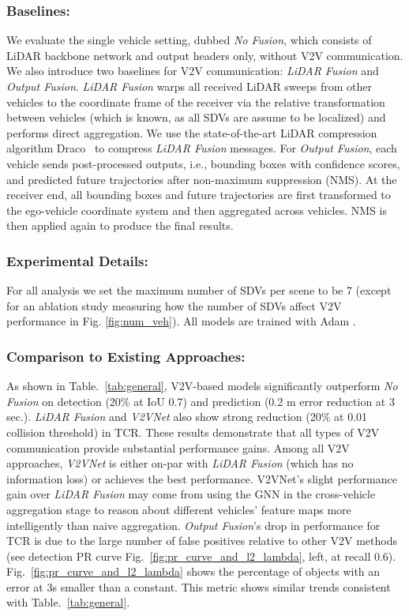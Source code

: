 \documentclass[runningheads]{llncs}
\newcommand{\tabref}{Table.~\ref}
\newcommand{\figref}{Fig.~\ref}
\begin{document}
\subsubsection{Baselines:}
We evaluate the single vehicle setting, dubbed \textit{No Fusion}, which consists of LiDAR backbone network and output headers only, without V2V communication. We also  introduce two baselines for V2V communication: \textit{LiDAR Fusion} and \textit{Output Fusion}.  \textit{LiDAR Fusion} warps all received LiDAR sweeps from other vehicles to the coordinate frame of the receiver
via the relative transformation between vehicles (which is known, as all SDVs are assume to be localized) and performs direct aggregation.
We use the state-of-the-art LiDAR compression algorithm Draco~\cite{draco} to compress \textit{LiDAR Fusion} messages.
For \textit{Output Fusion}, each vehicle sends post-processed outputs, i.e., bounding boxes with confidence scores, and predicted future trajectories after non-maximum suppression (NMS). At the receiver end, all bounding boxes and future trajectories are first transformed to the ego-vehicle coordinate system and then aggregated across vehicles. NMS is then applied again to produce the final results.

\subsubsection{Experimental Details:}
For all analysis we set the maximum number of SDVs per scene to be 7 
(except for an ablation study measuring how the number of SDVs affect V2V performance in Fig. \ref{fig:num_veh}).
All models are trained with 
Adam 
\cite{adam}.

\subsubsection{Comparison to Existing Approaches:}
As shown in \tabref{tab:general},
V2V-based models
significantly outperform
\textit{No Fusion} on detection (20\% at IoU 0.7) and prediction (0.2 m  error reduction at 3 sec.).  \textit{LiDAR Fusion} and \textit{V2VNet} also show strong reduction (20\% at 0.01 collision threshold) in TCR. These results demonstrate that all types of V2V communication 
provide substantial performance gains.
Among all V2V approaches, \textit{V2VNet} is either on-par with \textit{LiDAR Fusion} (which has no information loss) or achieves the best performance.
V2VNet's slight performance gain over \textit{LiDAR Fusion} may come from using the GNN in the cross-vehicle aggregation stage to reason about different vehicles' feature maps more intelligently than naive aggregation.
\textit{Output Fusion}'s drop in performance for TCR is due to the large number of false positives  relative to other V2V methods (see detection PR curve \figref{fig:pr_curve_and_l2_lambda}, left,  at recall  0.6).
\figref{fig:pr_curve_and_l2_lambda} shows the percentage of objects with an  error at 3s smaller than a constant. This metric shows similar trends consistent with  \tabref{tab:general}.
\end{document}
